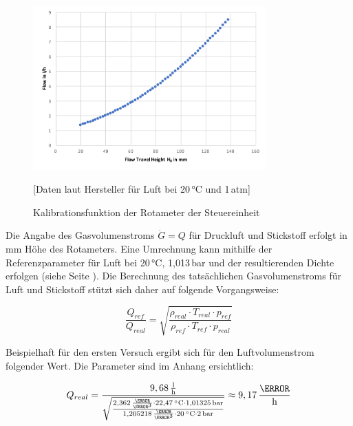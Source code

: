 \documentclass[12pt,liststotoc]{report}
\begin{document}

\begin{figure}[H]
\centering
\includegraphics[width=0.8\textwidth]{Graphics/Flowrate.pdf}
\caption{Kalibrationsfunktion der Rotameter der Steuereinheit}[Daten laut Hersteller für Luft bei 20\,°C und 1\,atm]
\label{KalibrationDurchfluss}
\end{figure}
\noindent

Die Angabe des Gasvolumenstroms $\dot{G} = Q$ für Druckluft und Stickstoff erfolgt in mm Höhe des Rotameters. Eine Umrechnung kann mithilfe der Referenzparameter für Luft bei 20\,°C, 1,013\,bar und der resultierenden Dichte erfolgen (siehe Seite \pageref{Referenzparamter}). Die Berechnung des tatsächlichen Gasvolumenstroms für Luft und Stickstoff stützt sich daher auf folgende Vorgangsweise:

\begin{equation}
    \frac{Q_{ref}}{Q_{real}}=\sqrt{\frac{\rho_{real} \cdot T_{real} \cdot p_{ref}}{\rho_{ref} \cdot T_{ref} \cdot p_{real}}}
\end{equation}

Beispielhaft für den ersten Versuch ergibt sich für den Luftvolumenstrom folgender Wert. Die Parameter sind im Anhang ersichtlich:

\begin{equation}
    Q_{real}=\frac{9,68\,\frac{\text{l}}{\text{h}}}{\sqrt{\frac{2,362\,\frac{\kg}{\m^3} \cdot 22,47\,^\circ\text{C} \cdot 1,01325\,\text{bar}}{1,205218\,\frac{\kg}{\m^3} \cdot 20\,^\circ\text{C} \cdot 2\,\text{bar}}}}\approx9,17\,\frac{\litre}{\text{h}}
\end{equation}
\end{document}
